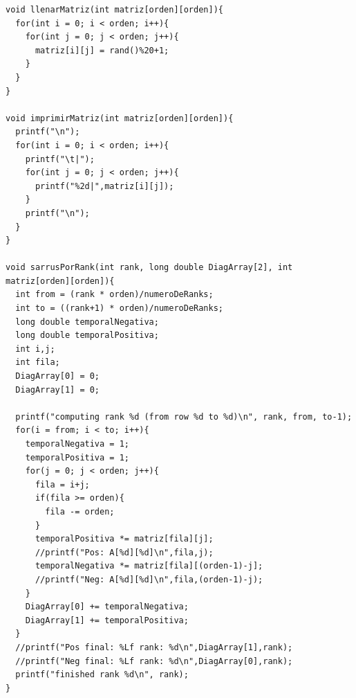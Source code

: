 \documentclass[10pt]{IEEEtran}
\begin{document}
\begin{lstlisting}
void llenarMatriz(int matriz[orden][orden]){
  for(int i = 0; i < orden; i++){
    for(int j = 0; j < orden; j++){
      matriz[i][j] = rand()%20+1;
    }
  }
}

void imprimirMatriz(int matriz[orden][orden]){
  printf("\n");
  for(int i = 0; i < orden; i++){
    printf("\t|");
    for(int j = 0; j < orden; j++){
      printf("%2d|",matriz[i][j]);
    }
    printf("\n");
  }
}

void sarrusPorRank(int rank, long double DiagArray[2], int matriz[orden][orden]){
  int from = (rank * orden)/numeroDeRanks;
  int to = ((rank+1) * orden)/numeroDeRanks;
  long double temporalNegativa;
  long double temporalPositiva;
  int i,j;
  int fila;
  DiagArray[0] = 0;
  DiagArray[1] = 0;

  printf("computing rank %d (from row %d to %d)\n", rank, from, to-1);
  for(i = from; i < to; i++){
    temporalNegativa = 1;
    temporalPositiva = 1;
    for(j = 0; j < orden; j++){
      fila = i+j;
      if(fila >= orden){
        fila -= orden;
      }
      temporalPositiva *= matriz[fila][j];
      //printf("Pos: A[%d][%d]\n",fila,j);
      temporalNegativa *= matriz[fila][(orden-1)-j];
      //printf("Neg: A[%d][%d]\n",fila,(orden-1)-j);
    }
    DiagArray[0] += temporalNegativa;
    DiagArray[1] += temporalPositiva;
  }
  //printf("Pos final: %Lf rank: %d\n",DiagArray[1],rank);
  //printf("Neg final: %Lf rank: %d\n",DiagArray[0],rank);
  printf("finished rank %d\n", rank);
}
\end{lstlisting}
\end{document}
